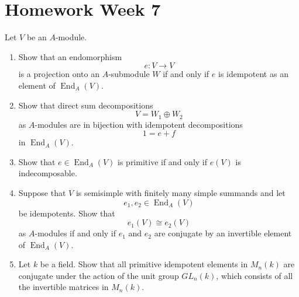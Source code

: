 \section{Homework Week 7}

\begin{exercise}
    Let \(V\) be an \(A\)-module.
    \begin{enumerate}
        \renewcommand{\labelenumi}{(\alph{enumi})}
        \item Show that an endomorphism
              \[
                  e \colon V \to V
              \]
              is a projection onto an \(A\)-submodule \(W\) if and only if \(e\) is idempotent as an element of \(\operatorname{End}_A(V)\).

        \item Show that direct sum decompositions
              \[
                  V = W_1 \oplus W_2
              \]
              as \(A\)-modules are in bijection with idempotent decompositions
              \[
                  1 = e + f
              \]
              in \(\operatorname{End}_A(V)\).

        \item Show that \(e \in \operatorname{End}_A(V)\) is primitive if and only if \(e(V)\) is indecomposable.

        \item Suppose that \(V\) is semisimple with finitely many simple summands and let
              \[
                  e_1, e_2 \in \operatorname{End}_A(V)
              \]
              be idempotents. Show that
              \[
                  e_1(V) \cong e_2(V)
              \]
              as \(A\)-modules if and only if \(e_1\) and \(e_2\) are conjugate by an invertible element of \(\operatorname{End}_A(V)\).

        \item Let \(k\) be a field. Show that all primitive idempotent elements in \(M_n(k)\) are conjugate under the action of the unit group \(GL_n(k)\), which consists of all the invertible matrices in \(M_n(k)\).
    \end{enumerate}
\end{exercise}

